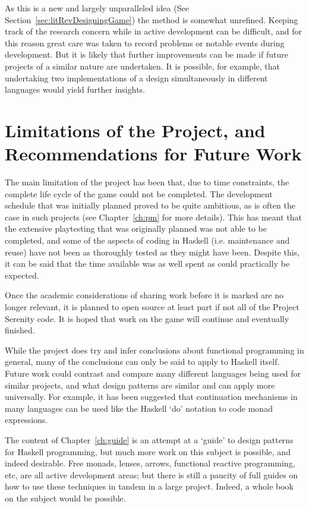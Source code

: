 As this is a new and largely unparalleled idea (See Section~\ref{sec:litRevDesigningGame}) the method is somewhat unrefined. Keeping track of the research concern while in active development can be difficult, and for this reason great care was taken to record problems or notable events during development. But it is likely that further improvements can be made if future projects of a similar nature are undertaken. It is possible, for example, that undertaking two implementations of a design simultaneously in different languages would yield further insights. 

\section{Limitations of the Project, and Recommendations for Future Work}

The main limitation of the project has been that, due to time constraints, the complete life cycle of the game could not be completed. The development schedule that was initially planned proved to be quite ambitious, as is often the case in such projects (see Chapter~\ref{ch:pm} for more details). This has meant that the extensive playtesting that was originally planned was not able to be completed, and some of the aspects of coding in Haskell (i.e. maintenance and reuse) have not been as thoroughly tested as they might have been. Despite this, it can be said that the time available was as well spent as could practically be expected.

Once the academic considerations of sharing work before it is marked are no longer relevant, it is planned to open source at least part if not all of the Project Serenity code. It is hoped that work on the game will continue and eventually finished. 

While the project does try and infer conclusions about functional programming in general, many of the conclusions can only be said to apply to Haskell itself. Future work could contrast and compare many different languages being used for similar projects, and what design patterns are similar and can apply more universally. For example, it has been suggested that continuation mechanisms in many languages can be used like the Haskell `do' notation to code monad expressions.\cite{piponi2008}

The content of Chapter~\ref{ch:guide} is an attempt at a `guide' to design patterns for Haskell programming, but much more work on this subject is possible, and indeed desirable. Free monads, lenses, arrows, functional reactive programming, etc, are all active development areas; but there is still a paucity of full guides on how to use these techniques in tandem in a large project. Indeed, a whole book on the subject would be possible.

